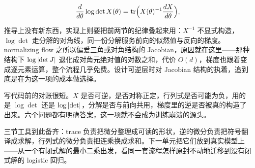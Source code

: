 \[
\frac{d}{d\theta}\log\det X(\theta)=\operatorname{tr}\Bigl(X(\theta)^{-1}\frac{dX}{d\theta}\Bigr),
\]

推导上没有新东西，实现上则要把前两节的纪律叠起来用：\(X^{-1}\) 不显式构造，\(\log\det\) 走分解的对角线，同一份分解服务前向的似然值与反向的梯度。normalizing flow 之所以偏爱三角或对角结构的 Jacobian，原因就在这里——那种结构下 \(\log\left|\det J\right|\) 退化成对角元绝对值的对数之和，代价 \(O(d)\)，梯度也跟着变成逐元素运算，整个流程几乎免费。设计可逆层时对 Jacobian 结构的执着，追到底是在为这一项的成本做选择。

写代码前的对账很短。\(X\) 是否可逆，是否对称正定，行列式是否可能为负，用的是 \(\log\det\) 还是 \(\log\left|\det\right|\)，分解是否与前向共用，梯度里的逆是否被真的构造了出来。六个问题都有明确答案，这一项就不会成为训练崩溃的源头。

三节工具到此备齐：trace 负责把微分整理成可读的形状，逆的微分负责把符号翻译成求解，行列式的微分负责把连乘换成求和。下一单元把它们放到真实模型上——从一个有闭式解的最小二乘出发，看同一套流程怎样原封不动地迁移到没有闭式解的 logistic 回归。
